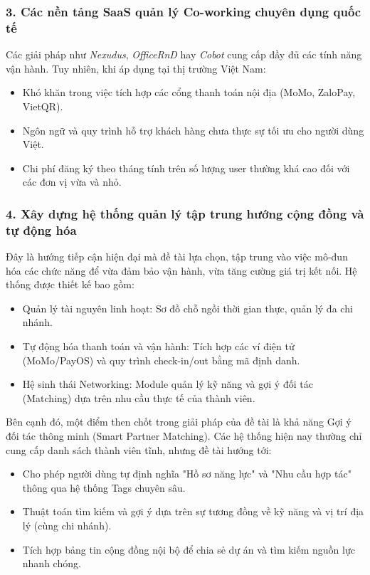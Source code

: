 \subsubsection*{3. Các nền tảng SaaS quản lý Co-working chuyên dụng quốc tế}
Các giải pháp như \textit{Nexudus}, \textit{OfficeRnD} hay \textit{Cobot} cung cấp đầy đủ các tính năng vận hành. Tuy nhiên, khi áp dụng tại thị trường Việt Nam:
\begin{itemize}
\item Khó khăn trong việc tích hợp các cổng thanh toán nội địa (MoMo, ZaloPay, VietQR).
\item Ngôn ngữ và quy trình hỗ trợ khách hàng chưa thực sự tối ưu cho người dùng Việt.
\item Chi phí đăng ký theo tháng tính trên số lượng user thường khá cao đối với các đơn vị vừa và nhỏ.
\end{itemize}

\subsubsection*{4. Xây dựng hệ thống quản lý tập trung hướng cộng đồng và tự động hóa}
Đây là hướng tiếp cận hiện đại mà đề tài lựa chọn, tập trung vào việc mô-đun hóa các chức năng để vừa đảm bảo vận hành, vừa tăng cường giá trị kết nối. Hệ thống được thiết kế bao gồm:
\begin{itemize}
\item Quản lý tài nguyên linh hoạt: Sơ đồ chỗ ngồi thời gian thực, quản lý đa chi nhánh.
\item Tự động hóa thanh toán và vận hành: Tích hợp các ví điện tử (MoMo/PayOS) và quy trình check-in/out bằng mã định danh.
\item Hệ sinh thái Networking: Module quản lý kỹ năng và gợi ý đối tác (Matching) dựa trên nhu cầu thực tế của thành viên.
\end{itemize}

Bên cạnh đó, một điểm then chốt trong giải pháp của đề tài là khả năng Gợi ý đối tác thông minh (Smart Partner Matching). Các hệ thống hiện nay thường chỉ cung cấp danh sách thành viên tĩnh, nhưng đề tài hướng tới:
\begin{itemize}
\item Cho phép người dùng tự định nghĩa "Hồ sơ năng lực" và "Nhu cầu hợp tác" thông qua hệ thống Tags chuyên sâu.
\item Thuật toán tìm kiếm và gợi ý dựa trên sự tương đồng về kỹ năng và vị trí địa lý (cùng chi nhánh).
\item Tích hợp bảng tin cộng đồng nội bộ để chia sẻ dự án và tìm kiếm nguồn lực nhanh chóng.
\end{itemize}

